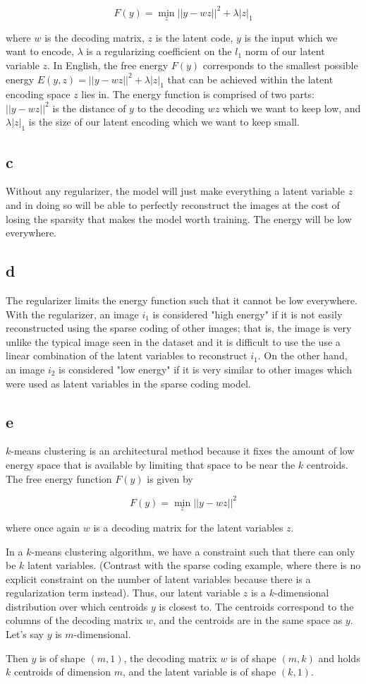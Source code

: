 \documentclass{article}
\begin{document}
$$F(y) = \min_z ||y -wz||^2 + \lambda|z|_1$$

where $w$ is the decoding matrix, $z$ is the latent code, $y$ is the input which we want to encode, $\lambda$ is a regularizing coefficient on the $l_1$ norm of our latent variable $z$. In English, the free energy $F(y)$ corresponds to the smallest possible energy $E(y,z) = ||y -wz||^2 + \lambda|z|_1$ that can be achieved within the latent encoding space $z$ lies in. The energy function is comprised of two parts: $||y -wz||^2$ is the distance of $y$ to the decoding $wz$ which we want to keep low, and $\lambda|z|_1$ is the size of our latent encoding which we want to keep small.

\subsection{c}
Without any regularizer, the model will just make everything a latent variable $z$ and in doing so will be able to perfectly reconstruct the images at the cost of losing the sparsity that makes the model worth training. The energy will be low everywhere.

\subsection{d}
The regularizer limits the energy function such that it cannot be low everywhere. With the regularizer, an image $i_1$ is considered "high energy" if it is not easily reconstructed using the sparse coding of other images; that is, the image is very unlike the typical image seen in the dataset and it is difficult to use the use a linear combination of the latent variables to reconstruct $i_1$. On the other hand, an image $i_2$ is considered "low energy" if it is very similar to other images which were used as latent variables in the sparse coding model. 

\subsection{e}
$k$-means clustering is an architectural method because it fixes the amount of low energy space that is available by limiting that space to be near the $k$ centroids. The free energy function $F(y)$ is given by 

$$F(y) = \min_z ||y - wz||^2$$

where once again $w$ is a decoding matrix for the latent variables $z$. 

In a $k$-means clustering algorithm, we have a constraint such that there can only be $k$ latent variables. (Contrast with the sparse coding example, where there is no explicit constraint on the number of latent variables because there is a regularization term instead). Thus, our latent variable $z$ is a $k$-dimensional distribution over which centroids $y$ is closest to. The centroids correspond to the columns of the decoding matrix $w$, and the centroids are in the same space as $y$. Let's say $y$ is $m$-dimensional.

Then $y$ is of shape $(m,1)$, the decoding matrix $w$ is of shape $(m,k)$ and holds $k$ centroids of dimension $m$, and the latent variable is of shape $(k,1)$.
\end{document}
